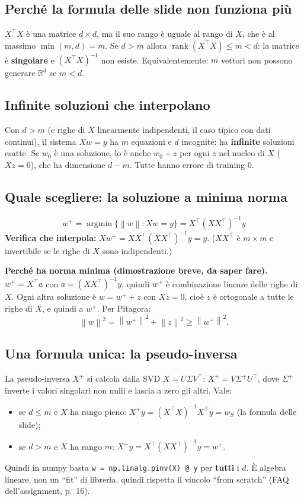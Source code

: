 \documentclass[11pt,a4paper]{article}
\newcommand{\R}{\mathbb{R}}
\newcommand{\norm}[1]{\left\lVert #1 \right\rVert}
\begin{document}
\subsection{Perché la formula delle slide non funziona più}
$X^\top X$ è una matrice $d \times d$, ma il suo rango è uguale al rango di $X$, che è al massimo $\min(m,d) = m$.
Se $d > m$ allora $\operatorname{rank}(X^\top X) \le m < d$: la matrice è \textbf{singolare} e $(X^\top X)^{-1}$ non esiste.
Equivalentemente: $m$ vettori non possono generare $\R^d$ se $m < d$.

\subsection{Infinite soluzioni che interpolano}
Con $d > m$ (e righe di $X$ linearmente indipendenti, il caso tipico con dati continui), il sistema $Xw = y$ ha
$m$ equazioni e $d$ incognite: ha \textbf{infinite} soluzioni esatte. Se $w_0$ è una soluzione, lo è anche $w_0 + z$
per ogni $z$ nel nucleo di $X$ ($Xz = 0$), che ha dimensione $d - m$. Tutte hanno errore di training $0$.

\subsection{Quale scegliere: la soluzione a minima norma}
\[
  \boxed{w^{+} = \operatorname*{argmin}\bigl\{\norm{w} : Xw = y\bigr\} = X^\top (X X^\top)^{-1} y}
\]
\textbf{Verifica che interpola:} $Xw^{+} = XX^\top(XX^\top)^{-1}y = y$. ($XX^\top$ è $m\times m$ e invertibile se
le righe di $X$ sono indipendenti.)

\textbf{Perché ha norma minima (dimostrazione breve, da saper fare).}
$w^{+} = X^\top a$ con $a = (XX^\top)^{-1}y$, quindi $w^{+}$ è combinazione lineare delle righe di $X$.
Ogni altra soluzione è $w = w^{+} + z$ con $Xz = 0$, cioè $z$ è ortogonale a tutte le righe di $X$, e quindi a $w^{+}$.
Per Pitagora:
\[
  \norm{w}^2 = \norm{w^{+}}^2 + \norm{z}^2 \ge \norm{w^{+}}^2 .
\]

\subsection{Una formula unica: la pseudo-inversa}
La pseudo-inversa $X^{+}$ si calcola dalla SVD $X = U\Sigma V^\top$: $X^{+} = V\Sigma^{+}U^\top$, dove $\Sigma^{+}$
inverte i valori singolari non nulli e lascia a zero gli altri. Vale:
\begin{itemize}
  \item se $d \le m$ e $X$ ha rango pieno: $X^{+}y = (X^\top X)^{-1}X^\top y = w_S$ (la formula delle slide);
  \item se $d > m$ e $X$ ha rango $m$: $X^{+}y = X^\top(XX^\top)^{-1}y = w^{+}$.
\end{itemize}
Quindi in numpy basta \texttt{w = np.linalg.pinv(X) @ y} per \textbf{tutti} i $d$.
È algebra lineare, non un ``fit'' di libreria, quindi rispetta il vincolo ``from scratch'' (FAQ dell'assignment, p.~16).
\end{document}
